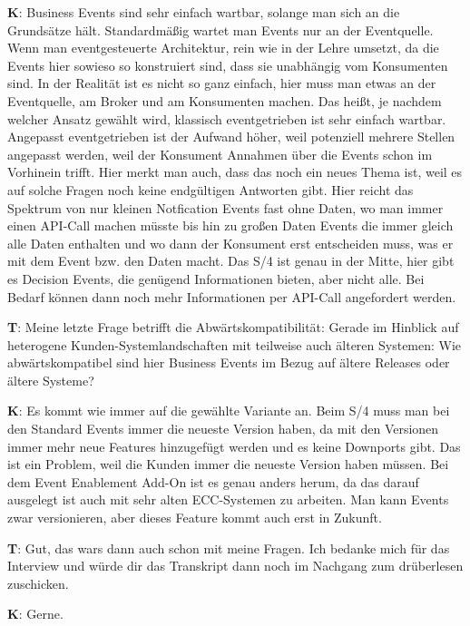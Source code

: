 \begin{list}{X:}{\setlength{\labelsep}{5mm}}
    \item[\textbf{K}:] Business Events sind sehr einfach wartbar, solange man sich an die Grundsätze hält. Standardmä{\ss}ig wartet man Events nur an der Eventquelle. Wenn man eventgesteuerte Architektur, rein wie in der Lehre umsetzt, da die Events hier sowieso so konstruiert sind, dass sie unabhängig vom Konsumenten sind. In der Realität ist es nicht so ganz einfach, hier muss man etwas an der Eventquelle, am Broker und am Konsumenten machen. Das hei{\ss}t, je nachdem welcher Ansatz gewählt wird, klassisch eventgetrieben ist sehr einfach wartbar. Angepasst eventgetrieben ist der Aufwand höher, weil potenziell mehrere Stellen angepasst werden, weil \zB der Konsument Annahmen über die Events schon im Vorhinein trifft. Hier merkt man auch, dass das noch ein neues Thema ist, weil es auf solche Fragen noch keine endgültigen Antworten gibt. Hier reicht das Spektrum von nur kleinen Notfication Events fast ohne Daten, wo man immer einen API-Call machen müsste bis hin zu gro{\ss}en Daten Events die immer gleich alle Daten enthalten und wo dann der Konsument erst entscheiden muss, was er mit dem Event bzw. den Daten macht. Das S/4 ist genau in der Mitte, hier gibt es Decision Events, die genügend Informationen bieten, aber nicht alle. Bei Bedarf können dann noch mehr Informationen per API-Call angefordert werden.
    \item[\textbf{T}:] Meine letzte Frage betrifft die Abwärtskompatibilität: Gerade im Hinblick auf heterogene Kunden-Systemlandschaften mit teilweise auch älteren Systemen: Wie abwärtskompatibel sind hier Business Events im Bezug auf ältere Releases oder ältere Systeme?
    \item[\textbf{K}:] Es kommt wie immer auf die gewählte Variante an. Beim S/4 muss man bei den Standard Events immer die neueste Version haben, da mit den Versionen immer mehr neue Features hinzugefügt werden und es keine Downports gibt. Das ist ein Problem, weil die Kunden immer die neueste Version haben müssen. Bei dem Event Enablement Add-On ist es genau anders herum, da das darauf ausgelegt ist auch mit sehr alten ECC-Systemen zu arbeiten. Man kann Events zwar versionieren, aber dieses Feature kommt auch erst in Zukunft.
    \item[\textbf{T}:] Gut, das wars dann auch schon mit meine Fragen. Ich bedanke mich für das Interview und würde dir das Transkript dann noch im Nachgang zum drüberlesen zuschicken.
    \item[\textbf{K}:] Gerne.
\end{list}

